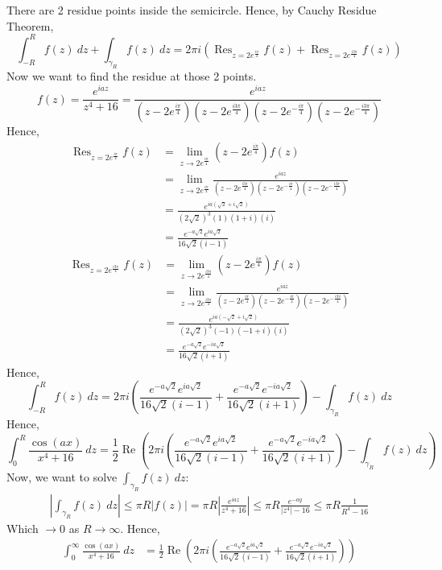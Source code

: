 \documentclass{article}
\newcommand{\abs}[1]{\left| #1 \right|}
\newcommand{\paren}[1]{\left(#1\right)}
\DeclareMathOperator{\real}{Re}
\DeclareMathOperator{\Res}{Res}
\begin{document}
\begin{enumerate}
There are 2 residue points inside the semicircle. Hence, by Cauchy Residue Theorem,
\[
\int_{-R}^R f(z)\ dz + \int_{\gamma_R} f(z)\ dz = 2\pi i(\Res_{z=2e^{\frac{i\pi}{4}}} f(z) + \Res_{z=2e^{\frac{i3\pi}{4}}} f(z))
\]
Now we want to find the residue at those 2 points.
\[
f(z) = \frac{e^{iaz}}{z^4 + 16} = \frac{e^{iaz}}{(z-2e^{\frac{i\pi}{4}})(z-2e^{\frac{i3\pi}{4}})(z-2e^{-\frac{i\pi}{4}})(z-2e^{-\frac{i3\pi}{4}})}
\]
Hence,
\begin{align*}
\Res_{z=2e^{\frac{i\pi}{4}}} f(z) &= \lim_{z \to 2e^{\frac{i\pi}{4}}} (z-2e^{\frac{i\pi}{4}})f(z) \\
    &= \lim_{z \to 2e^{\frac{i\pi}{4}}} \frac{e^{iaz}}{(z-2e^{\frac{i3\pi}{4}})(z-2e^{-\frac{i\pi}{4}})(z-2e^{-\frac{i3\pi}{4}})} \\
    &= \frac{e^{ia(\sqrt{2} + i\sqrt{2})}}{(2\sqrt{2})^3(1)(1+i)(i)} \\
    &= \frac{e^{-a\sqrt{2}}e^{ia\sqrt{2}}}{16\sqrt{2}(i-1)}
\end{align*}
\begin{align*}
\Res_{z=2e^{\frac{i3\pi}{4}}} f(z) &= \lim_{z \to 2e^{\frac{i3\pi}{4}}} (z-2e^{\frac{i\pi}{4}})f(z) \\
    &= \lim_{z \to 2e^{\frac{i3\pi}{4}}} \frac{e^{iaz}}{(z-2e^{\frac{i\pi}{4}})(z-2e^{-\frac{i\pi}{4}})(z-2e^{-\frac{i3\pi}{4}})} \\
    &= \frac{e^{ia(-\sqrt{2} + i\sqrt{2})}}{(2\sqrt{2})^3(-1)(-1+i)(i)} \\
    &= \frac{e^{-a\sqrt{2}}e^{-ia\sqrt{2}}}{16\sqrt{2}(i+1)}
\end{align*}
Hence,
\[
\int_{-R}^R f(z)\ dz = 2\pi i\paren{\frac{e^{-a\sqrt{2}}e^{ia\sqrt{2}}}{16\sqrt{2}(i-1)} + \frac{e^{-a\sqrt{2}}e^{-ia\sqrt{2}}}{16\sqrt{2}(i+1)}} - \int_{\gamma_R} f(z)\ dz
\]
Hence,
\[
\int_{0}^R \frac{\cos (ax)}{x^4 + 16}\ dz = \frac{1}{2}\real \paren{2\pi i\paren{\frac{e^{-a\sqrt{2}}e^{ia\sqrt{2}}}{16\sqrt{2}(i-1)} + \frac{e^{-a\sqrt{2}}e^{-ia\sqrt{2}}}{16\sqrt{2}(i+1)}} - \int_{\gamma_R} f(z)\ dz}
\]
Now, we want to solve $\int_{\gamma_R} f(z)\ dz$:
\begin{align*}
\abs{\int_{\gamma_R} f(z)\ dz} \leq \pi R |f(z)| = \pi R \abs{\frac{e^{iaz}}{z^4 + 16}} \leq \pi R \frac{e^{-ay}}{|z^4| - 16} \leq \pi R \frac{1}{R^4 - 16}
\end{align*}
Which $\to 0$ as $R \to \infty$. Hence,
\begin{align*}
\int_{0}^\infty \frac{\cos (ax)}{x^4 + 16}\ dz &= \frac{1}{2}\real \paren{2\pi i\paren{\frac{e^{-a\sqrt{2}}e^{ia\sqrt{2}}}{16\sqrt{2}(i-1)} + \frac{e^{-a\sqrt{2}}e^{-ia\sqrt{2}}}{16\sqrt{2}(i+1)}}} \\

\end{align*}
\end{enumerate}
\end{document}
